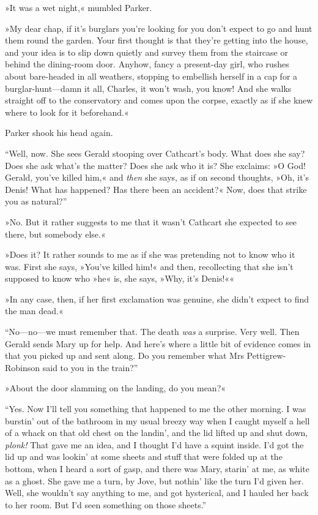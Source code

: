 »It was a wet night,« mumbled Parker.

»My dear chap, if it's burglars you're looking for you don't expect to go and hunt them round the garden. Your first thought is that they're getting into the house, and your idea is to slip down quietly and survey them from the staircase or behind the dining-room door. Anyhow, fancy a present-day girl, who rushes about bare-headed in all weathers, stopping to embellish herself in a cap for a burglar-hunt\allowbreak---\allowbreak damn it all, Charles, it won't wash, you know! And she walks straight off to the conservatory and comes upon the corpse, exactly as if she knew where to look for it beforehand.«

Parker shook his head again.

\enquote{Well, now. She sees Gerald stooping over Cathcart's body. What does she say? Does she ask what's the matter? Does she ask who it is? She exclaims: »O God! Gerald, you've killed him,« and \textit{then} she says, as if on second thoughts, »Oh, it's Denis! What has happened? Has there been an accident?« Now, does that strike you as natural?}

»No. But it rather suggests to me that it wasn't Cathcart she expected to see there, but somebody else.«

»Does it? It rather sounds to me as if she was pretending not to know who it was. First she says, »You've killed him!« and then, recollecting that she isn't supposed to know who »he« is, she says, »Why, it's Denis!««

»In any case, then, if her first exclamation was genuine, she didn't expect to find the man dead.«

\enquote{No\allowbreak---\allowbreak no---we must remember that. The death \textit{was} a surprise. Very well.  Then Gerald sends Mary up for help. And here's where a little bit of evidence comes in that you picked up and sent along. Do you remember what Mrs Pettigrew-Robinson said to you in the train?}

»About the door slamming on the landing, do you mean?«

\enquote{Yes. Now I'll tell you something that happened to me the other morning. I was burstin' out of the bathroom in my usual breezy way when I caught myself a hell of a whack on that old chest on the landin', and the lid lifted up and shut down, \textit{plonk!} That gave me an idea, and I thought I'd have a squint inside. I'd got the lid up and was lookin' at some sheets and stuff that were folded up at the bottom, when I heard a sort of gasp, and there was Mary, starin' at me, as white as a ghost.  She gave me a turn, by Jove, but nothin' like the turn I'd given her.  Well, she wouldn't say anything to me, and got hysterical, and I hauled her back to her room. But I'd seen something on those sheets.}

